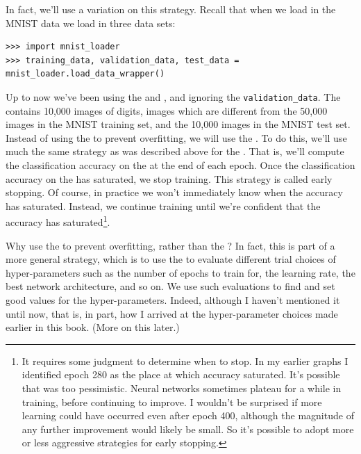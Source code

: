 \documentclass[a4paper,twoside,10pt]{book}
\begin{document}
In fact, we'll use a variation on this strategy. Recall that when we load in the MNIST data we load in three data sets:
\begin{lstlisting}
>>> import mnist_loader 
>>> training_data, validation_data, test_data = mnist_loader.load_data_wrapper()
\end{lstlisting}
Up to now we've been using the  and , and ignoring the \texttt{validation\_data}. The  contains 10,000 images of digits, images which are different from the 50,000 images in the MNIST training set, and the 10,000 images in the MNIST test set. Instead of using the  to prevent overfitting, we will use the . To do this, we'll use much the same strategy as was described above for the . That is, we'll compute the classification accuracy on the  at the end of each epoch. Once the classification accuracy on the  has saturated, we stop training. This strategy is called early stopping. Of course, in practice we won't immediately know when the accuracy has saturated. Instead, we continue training until we're confident that the accuracy has saturated\footnote{It requires some judgment to determine when to stop. In my earlier graphs I identified epoch 280 as the place at which accuracy saturated. It's possible that was too pessimistic. Neural networks sometimes plateau for a while in training, before continuing to improve. I wouldn't be surprised if more learning could have occurred even after epoch 400, although the magnitude of any further improvement would likely be small. So it's possible to adopt more or less aggressive strategies for early stopping.}.

Why use the  to prevent overfitting, rather than the ? In fact, this is part of a more general strategy, which is to use the  to evaluate different trial choices of hyper-parameters such as the number of epochs to train for, the learning rate, the best network architecture, and so on. We use such evaluations to find and set good values for the hyper-parameters. Indeed, although I haven't mentioned it until now, that is, in part, how I arrived at the hyper-parameter choices made earlier in this book. (More on this later.)
\end{document}

